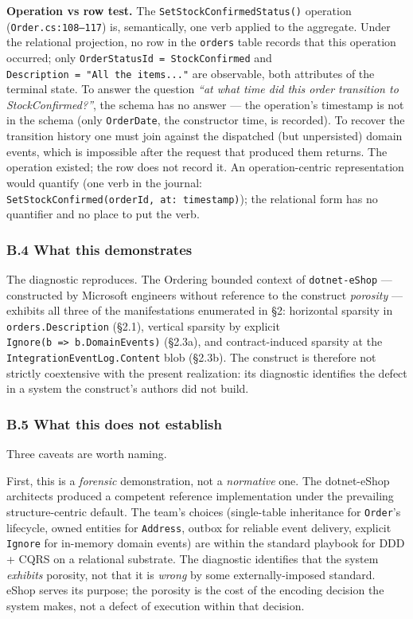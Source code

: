 \documentclass[
]{article}
\let\origtexttt\texttt%
\renewcommand{\texttt}[1]{\origtexttt{\seqsplit{#1}}}%
\let\texttt\origtexttt%
\begin{document}
\textbf{Operation vs row test.} The \texttt{SetStockConfirmedStatus()}
operation (\texttt{Order.cs:108–117}) is, semantically, one verb applied
to the aggregate. Under the relational projection, no row in the
\texttt{orders} table records that this operation occurred; only
\texttt{OrderStatusId\ =\ StockConfirmed} and
\texttt{Description\ =\ "All\ the\ items..."} are observable, both
attributes of the terminal state. To answer the question \emph{``at what
time did this order transition to StockConfirmed?''}, the schema has no
answer --- the operation's timestamp is not in the schema (only
\texttt{OrderDate}, the constructor time, is recorded). To recover the
transition history one must join against the dispatched (but
unpersisted) domain events, which is impossible after the request that
produced them returns. The operation existed; the row does not record
it. An operation-centric representation would quantify (one verb in the
journal: \texttt{SetStockConfirmed(orderId,\ at:\ timestamp)}); the
relational form has no quantifier and no place to put the verb.

\subsubsection{B.4 What this
demonstrates}\label{b.4-what-this-demonstrates}

The diagnostic reproduces. The Ordering bounded context of
\texttt{dotnet-eShop} --- constructed by Microsoft engineers without
reference to the construct \emph{porosity} --- exhibits all three of the
manifestations enumerated in §2: horizontal sparsity in
\texttt{orders.Description} (§2.1), vertical sparsity by explicit
\texttt{Ignore(b\ =\textgreater{}\ b.DomainEvents)} (§2.3a), and
contract-induced sparsity at the \texttt{IntegrationEventLog.Content}
blob (§2.3b). The construct is therefore not strictly coextensive with
the present realization: its diagnostic identifies the defect in a
system the construct's authors did not build.

\subsubsection{B.5 What this does not
establish}\label{b.5-what-this-does-not-establish}

Three caveats are worth naming.

First, this is a \emph{forensic} demonstration, not a \emph{normative}
one. The dotnet-eShop architects produced a competent reference
implementation under the prevailing structure-centric default. The
team's choices (single-table inheritance for \texttt{Order}'s lifecycle,
owned entities for \texttt{Address}, outbox for reliable event delivery,
explicit \texttt{Ignore} for in-memory domain events) are within the
standard playbook for DDD + CQRS on a relational substrate. The
diagnostic identifies that the system \emph{exhibits} porosity, not that
it is \emph{wrong} by some externally-imposed standard. eShop serves its
purpose; the porosity is the cost of the encoding decision the system
makes, not a defect of execution within that decision.
\end{document}
